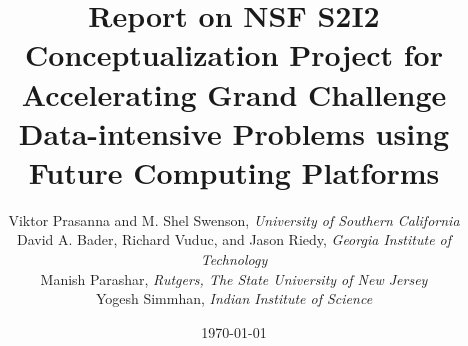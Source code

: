 \documentclass[11pt]{article}
\begin{document}
\title{Report on NSF S2I2 Conceptualization Project for \\
\textbf{Accelerating Grand Challenge Data-intensive Problems using Future Computing Platforms}}
\author{Viktor Prasanna and M. Shel Swenson, \textit{University of Southern California} \\
David A. Bader, Richard Vuduc, and Jason Riedy, \textit{Georgia Institute of Technology} \\
Manish Parashar, \textit{Rutgers, The State University of New Jersey}\\
Yogesh Simmhan, \textit{Indian Institute of Science}}
\date{\today}
\maketitle


\pagebreak

\tableofcontents

\pagebreak
\end{document}
